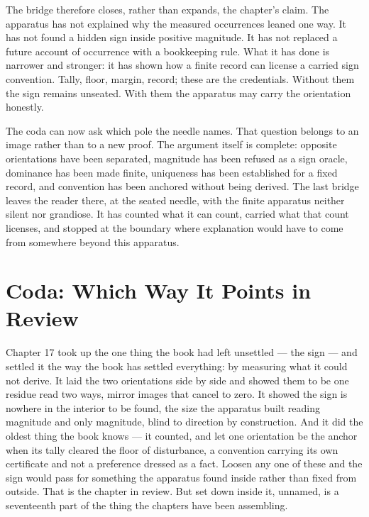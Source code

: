 The bridge therefore closes, rather than expands, the chapter's claim. The
apparatus has not explained why the measured occurrences leaned one way. It has
not found a hidden sign inside positive magnitude. It has not replaced a future
account of occurrence with a bookkeeping rule. What it has done is narrower and
stronger: it has shown how a finite record can license a carried sign
convention. Tally, floor, margin, record; these are the credentials. Without
them the sign remains unseated. With them the apparatus may carry the
orientation honestly.

The coda can now ask which pole the needle names. That question belongs to an
image rather than to a new proof. The argument itself is complete: opposite
orientations have been separated, magnitude has been refused as a sign oracle,
dominance has been made finite, uniqueness has been established for a fixed record,
and convention has been anchored without being derived. The last bridge leaves
the reader there, at the seated needle, with the finite apparatus neither
silent nor grandiose. It has counted what it can count, carried what that count
licenses, and stopped at the boundary where explanation would have to come from
somewhere beyond this apparatus.

\section*{Coda: Which Way It Points in Review}

Chapter 17 took up the one thing the book had left unsettled --- the sign --- and settled it the way the book has settled everything: by measuring what it could not derive. It laid the two orientations side by side and showed them to be one residue read two ways, mirror images that cancel to zero. It showed the sign is nowhere in the interior to be found, the size the apparatus built reading magnitude and only magnitude, blind to direction by construction. And it did the oldest thing the book knows --- it counted, and let one orientation be the anchor when its tally cleared the floor of disturbance, a convention carrying its own certificate and not a preference dressed as a fact. Loosen any one of these and the sign would pass for something the apparatus found inside rather than fixed from outside. That is the chapter in review. But set down inside it, unnamed, is a seventeenth part of the thing the chapters have been assembling.

